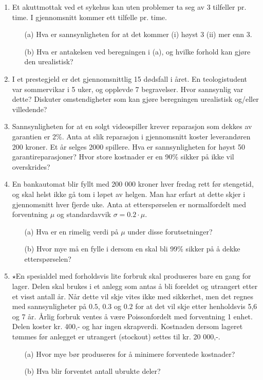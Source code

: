 \begin{enumerate}
\item Et  akuttmottak ved et sykehus kan uten problemer ta seg av 3 tilfeller
      pr. time. I gjennomsnitt kommer ett tilfelle pr. time.
      \begin{itemize}
      \item[(a)] Hva er sannsynligheten for at det kommer (i) høyst 3 
                 (ii) mer enn 3.
      \item[(b)] Hva er antakelsen ved beregningen i (a), og hvilke forhold 
                 kan gjøre den urealistisk?
      \end{itemize}

\item I et prestegjeld er det gjennomsnittlig 15 dødsfall i året.
      En teologistudent var sommervikar i 5 uker, og opplevde 7 begravelser.
      Hvor sannsynlig var dette? Diskuter omstendigheter som kan gjøre
      beregningen urealistisk og/eller villedende?
      
\item Sannsynligheten for at en solgt videospiller krever reparasjon som dekkes
      av garantien er 2\%. Anta at slik reparasjon i gjennomsnitt koster
      leverandøren 200 kroner. Et år selges 2000 spillere. 
      Hva er sannsynligheten for høyst 50 garantireparasjoner?
      Hvor store kostnader er en 90\% sikker på ikke vil overskrides? 

\item En bankautomat blir fyllt med 200 000 kroner hver fredag rett før
      stengetid, og skal helst ikke gå tom i løpet av helgen.
      Man har erfart at dette skjer i gjennomsnitt hver fjerde uke.
      Anta at etterspørselen er normalfordelt med forventning $\mu$ og
      standardavvik $\sigma = 0.2\cdot \mu$. 
      \begin{itemize}
      \item[(a)] Hva er en rimelig verdi på $\mu$ under disse
                 forutsetninger? 
      \item[(b)] Hvor mye må en fylle i dersom en skal bli 
                 99\% sikker på å dekke etterspørselen? 
\end{itemize}

\item $\star$En spesialdel med forholdsvis lite forbruk skal produseres
     bare en gang for lager. Delen skal brukes i et anlegg som
     antas å bli foreldet og utrangert etter et visst antall år.
     Når dette vil skje vites ikke med sikkerhet, men det regnes
     med sannsynligheter på $0.5$, $0.3$ og $0.2$ for at det vil
     skje etter henholdsvis 5,6 og 7 år. Årlig forbruk ventes å
     være Poissonfordelt med forventning 1 enhet. Delen koster
     kr. 400,- og har ingen skrapverdi. Kostnaden dersom lageret
     tømmes før anlegget er utrangert (stockout) settes til kr.
     20 000,-.
     \begin{itemize}
     \item[(a)]  Hvor mye bør produseres for å minimere
          forventede kostnader?
     \item[(b)]  Hva blir forventet antall ubrukte deler?
     \end{itemize}


\end{enumerate}
